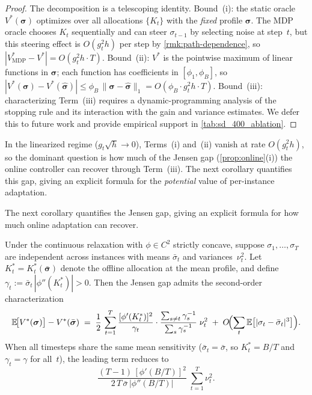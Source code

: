 \begin{proof}
The decomposition is a telescoping identity.
Bound~(i): the static oracle $V^*(\boldsymbol{\sigma})$ optimizes
over all allocations $\{K_t\}$ with the \emph{fixed} profile
$\boldsymbol{\sigma}$.
The MDP oracle chooses $K_t$ sequentially and can steer
$\sigma_{t-1}$ by selecting noise at step~$t$, but this steering
effect is $O(g_t^2 h)$ per step by
\cref{rmk:path-dependence}, so $|V_{\mathrm{MDP}}^*-V^*|
= O(g_t^2 h\cdot T)$.
Bound~(ii): $V^*$ is the pointwise maximum of linear functions in
$\boldsymbol{\sigma}$; each function has coefficients in
$[\phi_1,\phi_B]$, so $|V^*(\boldsymbol{\sigma})-
V^*(\hat{\boldsymbol{\sigma}})| \le
\phi_B\,\|\boldsymbol{\sigma}-\hat{\boldsymbol{\sigma}}\|_1
= O(\phi_B\cdot g_t^2 h\cdot T)$.
Bound~(iii): characterizing Term~(iii) requires a
dynamic-programming analysis of the stopping rule and its
interaction with the gain and variance estimates.
We defer this to future work and provide empirical
support in \cref{tab:sd_400_ablation}.
\end{proof}

\begin{remark}
\label{rmk:regret-decomp}
In the linearized regime ($g_t\sqrt{h}\to 0$),
Terms~(i) and~(ii) vanish at rate $O(g_t^2 h)$,
so the dominant question is how much of the Jensen gap
(\cref{prop:online}(i)) the online controller can recover
through Term~(iii).
The next corollary quantifies this gap, giving an explicit
formula for the \emph{potential} value of per-instance adaptation.
\end{remark}

The next corollary quantifies the Jensen gap, giving an explicit
formula for how much online adaptation can recover.

\begin{corollary}
\label{cor:jensen-value}
Under the continuous relaxation with $\phi\in C^2$ strictly concave,
suppose $\sigma_1,\ldots,\sigma_T$ are independent across instances
with means $\bar\sigma_t$ and variances~$\nu_t^2$.
Let $K_t^*=K_t^*(\bar{\boldsymbol{\sigma}})$ denote the offline
allocation at the mean profile, and define
$\gamma_t := \bar\sigma_t\,|\phi''(K_t^*)|>0$.
Then the Jensen gap admits the second-order characterization
\begin{equation}
  \mathbb{E}\!\bigl[V^*(\boldsymbol{\sigma})\bigr]
  -V^*(\bar{\boldsymbol{\sigma}})
  \;=\;
  \frac{1}{2}\,
  \sum_{t=1}^T
  \frac{[\phi'(K_t^*)]^2}{\gamma_t}
  \cdot
  \frac{\sum_{s\ne t}\gamma_s^{-1}}{\sum_{s}\gamma_s^{-1}}
  \;\nu_t^2
  \;+\; O\!\Bigl(\sum_t\mathbb{E}\bigl[|\sigma_t-\bar\sigma_t|^3
  \bigr]\Bigr).
  \label{eq:jensen-value}
\end{equation}
When all timesteps share the same mean sensitivity
($\bar\sigma_t=\bar\sigma$, so $K_t^*=B/T$ and
$\gamma_t=\gamma$ for all~$t$),
the leading term reduces to
\begin{equation}
  \frac{(T{-}1)\,[\phi'(B/T)]^2}{2\,T\,\bar\sigma\,|\phi''(B/T)|}
  \;\sum_{t=1}^T \nu_t^2.
  \label{eq:jensen-value-symmetric}
\end{equation}
\end{corollary}

